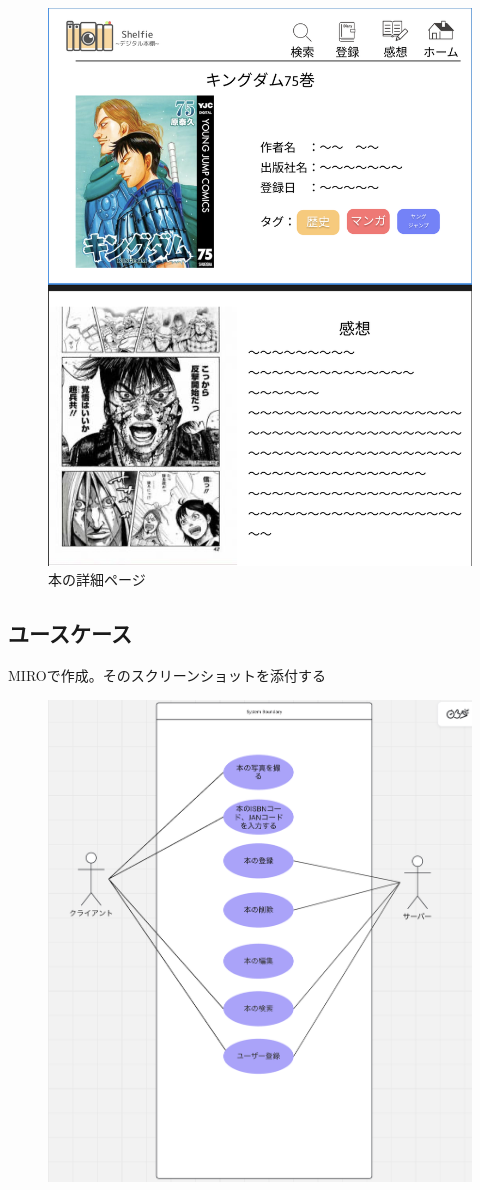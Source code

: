 \documentclass[a4paper, 11pt, titlepage]{jsarticle}
\begin{document}
\begin{figure}[htbp]
\centering
\includegraphics[width=120mm]{detailpage.png}
\caption{本の詳細ページ}
\label{fig:func}
\end{figure}

\subsection{ユースケース}
MIROで作成。そのスクリーンショットを添付する
\begin{figure}[htbp]
\centering
\includegraphics[width=120mm]{usecase.png}
\label{fig:func}
\end{figure}
\end{document}
